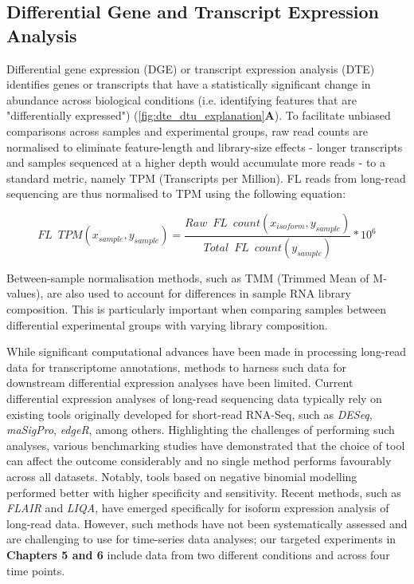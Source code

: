 \subsection{Differential Gene and Transcript Expression Analysis}
Differential gene expression (DGE) or transcript expression analysis (DTE) identifies genes or transcripts that have a statistically significant change in abundance across biological conditions (i.e. identifying features that are "differentially expressed") (\cref{fig:dte_dtu_explanation}\textbf{A}). To facilitate unbiased comparisons across samples and experimental groups, raw read counts are normalised to eliminate feature-length and library-size effects - longer transcripts and samples sequenced at a higher depth would accumulate more reads - to a standard metric, namely TPM (Transcripts per Million). FL reads from long-read sequencing are thus normalised to TPM using the following equation: 

\begin{myequation}[!h]
	\begin{equation}
		FL\;\:TPM (x_{sample},y_{sample})=\frac{Raw\;\:FL\;\:count (x_{isoform},y_{sample})}{Total\;\:FL\;\:count (y_{sample})} *10^6
	\end{equation}
\end{myequation}

Between-sample normalisation methods, such as TMM\cite{Robinson2010} (Trimmed Mean of M-values), are also used to account for differences in sample RNA library composition. This is particularly important when comparing samples between differential experimental groups with varying library composition. 

While significant computational advances have been made in processing long-read data for transcriptome annotations, methods to harness such data for downstream differential expression analyses have been limited. Current differential expression analyses of long-read sequencing data typically rely on existing tools originally developed for short-read RNA-Seq\cite{Amarasinghe2020}, such as \textit{DESeq}, \textit{maSigPro}, \textit{edgeR}, among others. Highlighting the challenges of performing such analyses, various benchmarking studies have demonstrated that the choice of tool can affect the outcome considerably and no single method performs favourably across all datasets. Notably, tools based on negative binomial modelling performed better with higher specificity and sensitivity\cite{Rapaport2013}. Recent methods, such as \textit{FLAIR} and \textit{LIQA}\cite{Hu2021}, have emerged specifically for isoform expression analysis of long-read data. However, such methods have not been systematically assessed and are challenging to use for time-series data analyses; our targeted experiments in \textbf{Chapters 5 and 6} include data from two different conditions and across four time points. 

